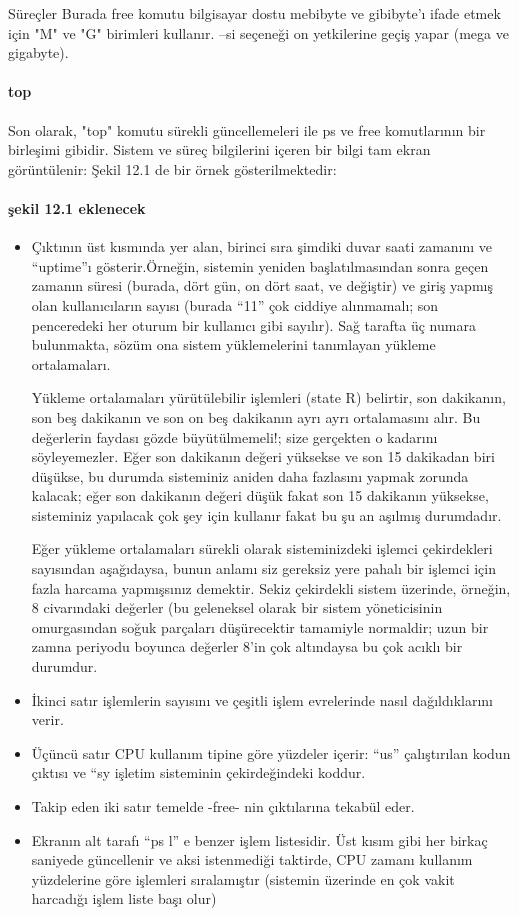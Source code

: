 \begin{section}{Süreçler}
Burada free komutu bilgisayar dostu mebibyte ve gibibyte'ı ifade etmek için "M" ve "G" birimleri kullanır. --si seçeneği on yetkilerine geçiş yapar (mega ve gigabyte).

\paragraph{top}{Son olarak, "top" komutu sürekli güncellemeleri ile ps ve free komutlarının bir birleşimi gibidir. Sistem ve süreç bilgilerini içeren bir bilgi tam ekran görüntülenir: Şekil 12.1 de bir örnek gösterilmektedir:}
\paragraph{şekil 12.1 eklenecek}{}

\begin{itemize}
\item Çıktının üst kısmında yer alan, birinci sıra şimdiki duvar saati zamanını ve “uptime”ı gösterir.Örneğin, sistemin yeniden başlatılmasından sonra geçen zamanın süresi (burada, dört gün, on dört saat, ve değiştir) ve giriş yapmış olan kullanıcıların sayısı (burada “11” çok ciddiye alınmamalı; son penceredeki her oturum bir kullanıcı gibi sayılır). Sağ tarafta üç numara bulunmakta, sözüm ona sistem yüklemelerini tanımlayan yükleme ortalamaları.

Yükleme ortalamaları yürütülebilir işlemleri (state R) belirtir, son dakikanın, son beş dakikanın ve son on beş dakikanın ayrı ayrı ortalamasını alır. Bu değerlerin faydası gözde büyütülmemeli!; size gerçekten o kadarını söyleyemezler. Eğer son dakikanın değeri yüksekse ve son 15 dakikadan biri düşükse, bu durumda sisteminiz aniden daha fazlasını yapmak zorunda kalacak; eğer son dakikanın değeri düşük fakat son 15 dakikanın yüksekse, sisteminiz yapılacak çok şey için kullanır fakat bu şu an aşılmış durumdadır.

Eğer yükleme ortalamaları sürekli olarak sisteminizdeki işlemci çekirdekleri sayısından aşağıdaysa, bunun anlamı siz gereksiz yere pahalı bir işlemci için fazla harcama yapmışsınız demektir. Sekiz çekirdekli sistem üzerinde, örneğin, 8 civarındaki değerler (bu geleneksel olarak bir sistem yöneticisinin omurgasından soğuk parçaları düşürecektir tamamiyle normaldir; uzun bir zamna periyodu boyunca değerler 8’in çok altındaysa bu çok acıklı bir durumdur.

\item İkinci satır işlemlerin sayısını ve çeşitli işlem evrelerinde nasıl dağıldıklarını verir.
\item Üçüncü satır CPU kullanım tipine göre yüzdeler içerir: “us” çalıştırılan kodun çıktısı ve “sy işletim sisteminin çekirdeğindeki koddur.
\item Takip eden iki satır temelde -free- nin çıktılarına tekabül eder.
\item Ekranın alt tarafı “ps l” e benzer işlem listesidir. Üst kısım gibi her birkaç saniyede güncellenir ve aksi istenmediği taktirde, CPU zamanı kullanım yüzdelerine göre işlemleri sıralamıştır (sistemin üzerinde en çok vakit harcadığı işlem liste başı olur) 


\end{itemize}
\end{section}
